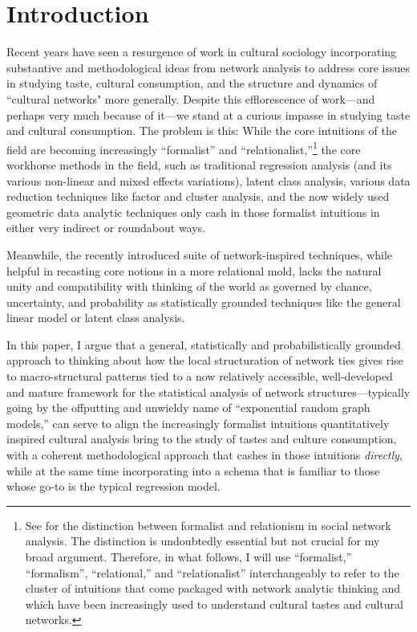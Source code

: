 \documentclass[preprint,12pt,authoryear]{elsarticle}
\begin{document}

\section{Introduction}
\label{sec:intro}
Recent years have seen a resurgence of work in cultural sociology incorporating substantive and methodological ideas from network analysis to address core issues in studying taste, cultural consumption, and the structure and dynamics of ``cultural networks" more generally. Despite this efflorescence of work---and perhaps very much because of it---we stand at a curious impasse in studying taste and cultural consumption. The problem is this: While the core intuitions of the field are becoming increasingly ``formalist'' and ``relationalist,''\footnote{See \citet{erikson2013formalist} for the distinction between formalist and relationism in social network analysis. The distinction is undoubtedly essential but not crucial for my broad argument. Therefore, in what follows, I will use ``formalist,'' ``formalism'', ``relational,'' and ``relationalist'' interchangeably to refer to the cluster of intuitions that come packaged with network analytic thinking and which have been increasingly used to understand cultural tastes and cultural networks.} the core workhorse methods in the field, such as traditional regression analysis (and its various non-linear and mixed effects variations), latent class analysis, various data reduction techniques like factor and cluster analysis, and the now widely used geometric data analytic techniques only cash in those formalist intuitions in either very indirect or roundabout ways. 

Meanwhile, the recently introduced suite of network-inspired techniques, while helpful in recasting core notions in a more relational mold, lacks the natural unity and compatibility with thinking of the world as governed by chance, uncertainty, and probability as statistically grounded techniques like the general linear model or latent class analysis. 

In this paper, I argue that a general, statistically and probabilistically grounded approach to thinking about how the local structuration of network ties gives rise to macro-structural patterns tied to a now relatively accessible, well-developed and mature framework for the statistical analysis of network structures---typically going by the offputting and unwieldy name of ``exponential random graph models,'' can serve to align the increasingly formalist intuitions quantitatively inspired cultural analysis bring to the study of tastes and culture consumption, with a coherent methodological approach that cashes in those intuitions \textit{directly}, while at the same time incorporating into a schema that is familiar to those whose go-to is the typical regression model. 
\end{document}
